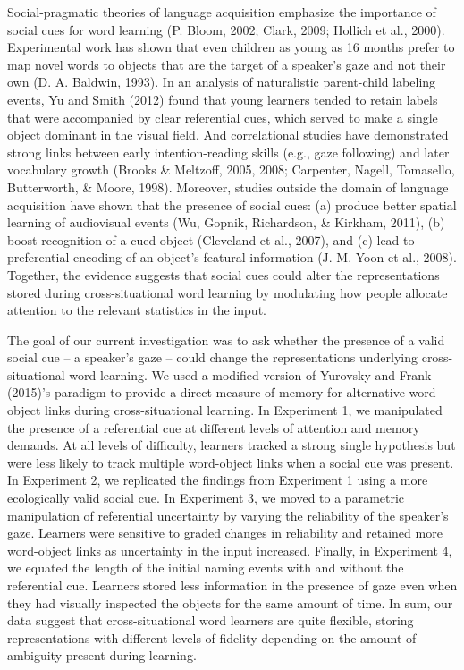 \documentclass[oneside]{report}
\begin{document}
Social-pragmatic theories of language acquisition emphasize the
importance of social cues for word learning (P. Bloom, 2002; Clark,
2009; Hollich et al., 2000). Experimental work has shown that even
children as young as 16 months prefer to map novel words to objects that
are the target of a speaker's gaze and not their own (D. A. Baldwin,
1993). In an analysis of naturalistic parent-child labeling events, Yu
and Smith (2012) found that young learners tended to retain labels that
were accompanied by clear referential cues, which served to make a
single object dominant in the visual field. And correlational studies
have demonstrated strong links between early intention-reading skills
(e.g., gaze following) and later vocabulary growth (Brooks \& Meltzoff,
2005, 2008; Carpenter, Nagell, Tomasello, Butterworth, \& Moore, 1998).
Moreover, studies outside the domain of language acquisition have shown
that the presence of social cues: (a) produce better spatial learning of
audiovisual events (Wu, Gopnik, Richardson, \& Kirkham, 2011), (b) boost
recognition of a cued object (Cleveland et al., 2007), and (c) lead to
preferential encoding of an object's featural information (J. M. Yoon et
al., 2008). Together, the evidence suggests that social cues could alter
the representations stored during cross-situational word learning by
modulating how people allocate attention to the relevant statistics in
the input.

The goal of our current investigation was to ask whether the presence of
a valid social cue -- a speaker's gaze -- could change the
representations underlying cross-situational word learning. We used a
modified version of Yurovsky and Frank (2015)'s paradigm to provide a
direct measure of memory for alternative word-object links during
cross-situational learning. In Experiment 1, we manipulated the presence
of a referential cue at different levels of attention and memory
demands. At all levels of difficulty, learners tracked a strong single
hypothesis but were less likely to track multiple word-object links when
a social cue was present. In Experiment 2, we replicated the findings
from Experiment 1 using a more ecologically valid social cue. In
Experiment 3, we moved to a parametric manipulation of referential
uncertainty by varying the reliability of the speaker's gaze. Learners
were sensitive to graded changes in reliability and retained more
word-object links as uncertainty in the input increased. Finally, in
Experiment 4, we equated the length of the initial naming events with
and without the referential cue. Learners stored less information in the
presence of gaze even when they had visually inspected the objects for
the same amount of time. In sum, our data suggest that cross-situational
word learners are quite flexible, storing representations with different
levels of fidelity depending on the amount of ambiguity present during
learning.
\end{document}
